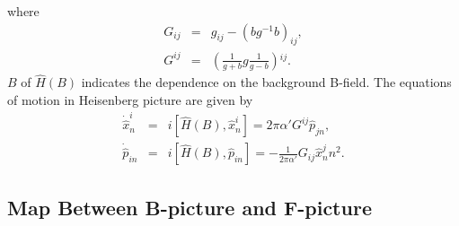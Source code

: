 \documentclass[a4paper,12pt]{article}
\newcommand{\nn}{\nonumber\\}
\begin{document}
where
\begin{eqnarray}
 \label{G}
G_{ij} &=& g_{ij} - (b g^{-1} b)_{ij}, \nn
G^{ij} &=&
\left(
\frac{1}{g+b} g \frac{1}{g-b}
\right)\!{}^{ij}.
\end{eqnarray}
$B$ of $\hat{H}(B)$ indicates the dependence on 
the background B-field.
The equations of motion
in Heisenberg picture are given by
\begin{eqnarray}
\dot{\hat{x}}^i_n &=& 
i[\hat{H}(B), \hat{x}^i_n]=
2\pi\alpha' G^{ij} \hat{p}_{jn}, \label{eqbx}\\
\dot{\hat{p}}_{i n} &=& 
i[\hat{H}(B),\hat{p}_{in}]
=
- \frac{1}{2\pi\alpha'} G_{ij} \hat{x}^j_n n^2 . \label{eqbp}
\end{eqnarray}






\subsection{Map Between B-picture and F-picture}
\end{document}

